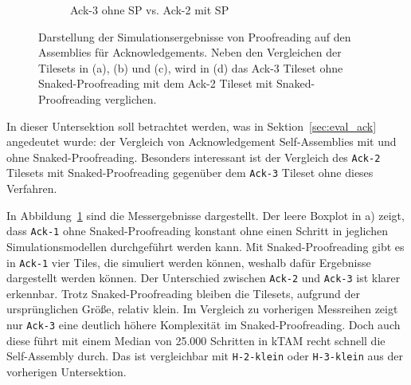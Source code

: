 \begin{figure}
\begin{subfigure}[b]{0.49\textwidth}
        \caption{Ack-3 ohne SP vs. Ack-2 mit SP}
    \end{subfigure}
    \caption[Simulationsergebnisse für Proofreading-Assemblies von Acknowledgements.]{Darstellung der Simulationsergebnisse von Proofreading auf den Assemblies für Acknowledgements. Neben den Vergleichen der Tilesets in (a), (b) und (c), wird in (d) das Ack-3 Tileset ohne Snaked-Proofreading mit dem Ack-2 Tileset mit Snaked-Proofreading verglichen.}
    \label{fig:proof_simulation_acks}
\end{figure}

In dieser Untersektion soll betrachtet werden, was in Sektion~\ref{sec:eval_ack} angedeutet wurde: der Vergleich von Acknowledgement Self-Assemblies mit und ohne Snaked-Proofreading. Besonders interessant ist der Vergleich des \texttt{Ack-2} Tilesets mit Snaked-Proofreading gegenüber dem \texttt{Ack-3} Tileset ohne dieses Verfahren.

In Abbildung~\ref{fig:proof_simulation_acks} sind die Messergebnisse dargestellt. Der leere Boxplot in a) zeigt, dass \texttt{Ack-1} ohne Snaked-Proofreading konstant ohne einen Schritt in jeglichen Simulationsmodellen durchgeführt werden kann. Mit Snaked-Proofreading gibt es in \texttt{Ack-1} vier Tiles, die simuliert werden können, weshalb dafür Ergebnisse dargestellt werden können. Der Unterschied zwischen \texttt{Ack-2} und \texttt{Ack-3} ist klarer erkennbar. Trotz Snaked-Proofreading bleiben die Tilesets, aufgrund der ursprünglichen Größe, relativ klein. Im Vergleich zu vorherigen Messreihen zeigt nur \texttt{Ack-3} eine deutlich höhere Komplexität im Snaked-Proofreading. Doch auch diese führt mit einem Median von 25.000 Schritten in kTAM recht schnell die Self-Assembly durch. Das ist vergleichbar mit \texttt{H-2-klein} oder \texttt{H-3-klein} aus der vorherigen Untersektion.

